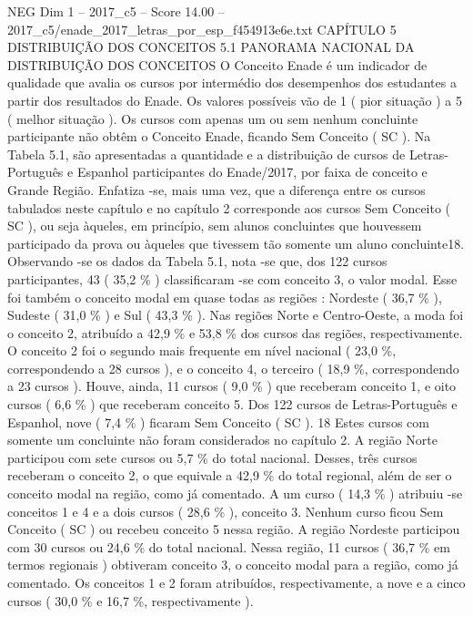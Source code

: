 \begin{textsample}{NEG Dim 1 – 2017\_c5 – Score 14.00 – 2017\_c5/enade\_2017\_letras\_por\_esp\_f454913e6e.txt}  \label{ex:f1_neg_389}
CAPÍTULO 5 DISTRIBUIÇÃO DOS CONCEITOS 5.1 PANORAMA NACIONAL DA DISTRIBUIÇÃO DOS CONCEITOS O Conceito Enade é um indicador de qualidade que avalia os cursos por intermédio dos desempenhos dos estudantes a partir dos resultados do Enade.
Os valores possíveis vão de 1 ( pior situação ) a 5 ( melhor situação ).
Os cursos com apenas um ou sem nenhum concluinte participante não obtêm o Conceito Enade, ficando Sem Conceito ( SC ).
Na Tabela 5.1, são apresentadas a quantidade e a distribuição de cursos de Letras-Português e Espanhol participantes do Enade/2017, por faixa de conceito e Grande Região.
Enfatiza -se, mais uma vez, que a diferença entre os cursos tabulados neste capítulo e no capítulo 2 corresponde aos cursos Sem Conceito ( SC ), ou seja àqueles, em princípio, sem alunos concluintes que houvessem participado da prova ou àqueles que tivessem tão somente um aluno concluinte18.
Observando -se os dados da Tabela 5.1, nota -se que, dos 122 cursos participantes, 43 ( 35,2 \% ) classificaram -se com conceito 3, o valor modal.
Esse foi também o conceito modal em quase todas as regiões : Nordeste ( 36,7 \% ), Sudeste ( 31,0 \% ) e Sul ( 43,3 \% ).
Nas regiões Norte e Centro-Oeste, a moda foi o conceito 2, atribuído a 42,9 \% e 53,8 \% dos cursos das regiões, respectivamente.
O conceito 2 foi o segundo mais frequente em nível nacional ( 23,0 \%, correspondendo a 28 cursos ), e o conceito 4, o terceiro ( 18,9 \%, correspondendo a 23 cursos ).
Houve, ainda, 11 cursos ( 9,0 \% ) que receberam conceito 1, e oito cursos ( 6,6 \% ) que receberam conceito 5.
Dos 122 cursos de Letras-Português e Espanhol, nove ( 7,4 \% ) ficaram Sem Conceito ( SC ). 18 Estes cursos com somente um concluinte não foram considerados no capítulo 2.
A região Norte participou com sete cursos ou 5,7 \% do total nacional.
Desses, três cursos receberam o conceito 2, o que equivale a 42,9 \% do total regional, além de ser o conceito modal na região, como já comentado.
A um curso ( 14,3 \% ) atribuiu -se conceitos 1 e 4 e a dois cursos ( 28,6 \% ), conceito 3.
Nenhum curso ficou Sem Conceito ( SC ) ou recebeu conceito 5 nessa região.
A região Nordeste participou com 30 cursos ou 24,6 \% do total nacional.
Nessa região, 11 cursos ( 36,7 \% em termos regionais ) obtiveram conceito 3, o conceito modal para a região, como já comentado.
Os conceitos 1 e 2 foram atribuídos, respectivamente, a nove e a cinco cursos ( 30,0 \% e 16,7 \%, respectivamente ).

\end{textsample}
